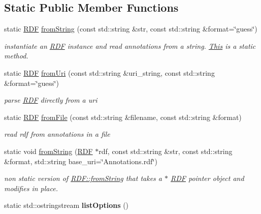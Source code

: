 \subsection*{Static Public Member Functions}
\begin{DoxyCompactItemize}
\item 
static \hyperlink{classomexmeta_1_1RDF}{R\+DF} \hyperlink{classomexmeta_1_1RDF_a9d91b3134cdcc6dfef6d62b7b09d8da2}{from\+String} (const std\+::string \&str, const std\+::string \&format=\char`\"{}guess\char`\"{})
\begin{DoxyCompactList}\small\item\em instantiate an \hyperlink{classomexmeta_1_1RDF}{R\+DF} instance and read annotations from a string. \hyperlink{classThis}{This} is a static method. \end{DoxyCompactList}\item 
static \hyperlink{classomexmeta_1_1RDF}{R\+DF} \hyperlink{classomexmeta_1_1RDF_a03906aa5c3b9429a2afdbe0ad2be21e6}{from\+Uri} (const std\+::string \&uri\+\_\+string, const std\+::string \&format=\char`\"{}guess\char`\"{})
\begin{DoxyCompactList}\small\item\em parse \hyperlink{classomexmeta_1_1RDF}{R\+DF} directly from a uri \end{DoxyCompactList}\item 
static \hyperlink{classomexmeta_1_1RDF}{R\+DF} \hyperlink{classomexmeta_1_1RDF_a98a1da84161a7935bf38ec5e5d34e91f}{from\+File} (const std\+::string \&filename, const std\+::string \&format)
\begin{DoxyCompactList}\small\item\em read rdf from annotations in a file \end{DoxyCompactList}\item 
static void \hyperlink{classomexmeta_1_1RDF_ab2dadc7ff1cf25edbb401b2c879a21b0}{from\+String} (\hyperlink{classomexmeta_1_1RDF}{R\+DF} $\ast$rdf, const std\+::string \&str, const std\+::string \&format, std\+::string base\+\_\+uri=\char`\"{}Annotations.\+rdf\char`\"{})
\begin{DoxyCompactList}\small\item\em non static version of \hyperlink{classomexmeta_1_1RDF_a9d91b3134cdcc6dfef6d62b7b09d8da2}{R\+D\+F\+::from\+String} that takes a $\ast$ \hyperlink{classomexmeta_1_1RDF}{R\+DF} pointer object and modifies in place. \end{DoxyCompactList}\item 
\mbox{\label{classomexmeta_1_1RDF_ae01ed260e02eda2141ffe1288f78c177}} 
static std\+::ostringstream {\bfseries list\+Options} ()
\end{DoxyCompactItemize}
